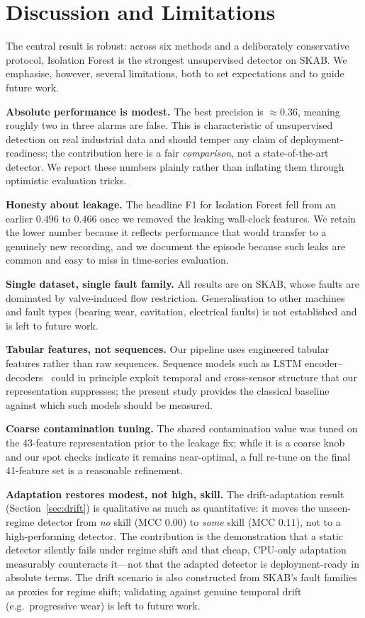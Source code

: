 \documentclass[conference]{IEEEtran}
\begin{document}
\section{Discussion and Limitations}
\label{sec:discussion}
The central result is robust: across six methods and a deliberately conservative
protocol, Isolation Forest is the strongest unsupervised detector on SKAB. We
emphasise, however, several limitations, both to set expectations and to guide
future work.

\textbf{Absolute performance is modest.} The best precision is $\approx 0.36$,
meaning roughly two in three alarms are false. This is characteristic of
unsupervised detection on real industrial data and should temper any claim of
deployment-readiness; the contribution here is a fair \emph{comparison}, not a
state-of-the-art detector. We report these numbers plainly rather than inflating
them through optimistic evaluation tricks.

\textbf{Honesty about leakage.} The headline F1 for Isolation Forest fell from
an earlier $0.496$ to $0.466$ once we removed the leaking wall-clock features.
We retain the lower number because it reflects performance that would transfer
to a genuinely new recording, and we document the episode because such leaks are
common and easy to miss in time-series evaluation.

\textbf{Single dataset, single fault family.} All results are on SKAB, whose
faults are dominated by valve-induced flow restriction. Generalisation to other
machines and fault types (bearing wear, cavitation, electrical faults) is not
established and is left to future work.

\textbf{Tabular features, not sequences.} Our pipeline uses engineered tabular
features rather than raw sequences. Sequence models such as LSTM
encoder--decoders~\cite{malhotra2016} could in principle exploit temporal and
cross-sensor structure that our representation suppresses; the present study
provides the classical baseline against which such models should be measured.

\textbf{Coarse contamination tuning.} The shared contamination value was tuned
on the 43-feature representation prior to the leakage fix; while it is a coarse
knob and our spot checks indicate it remains near-optimal, a full re-tune on the
final 41-feature set is a reasonable refinement.

\textbf{Adaptation restores modest, not high, skill.} The drift-adaptation
result (Section~\ref{sec:drift}) is qualitative as much as quantitative: it
moves the unseen-regime detector from \emph{no} skill (MCC $0.00$) to
\emph{some} skill (MCC $0.11$), not to a high-performing detector. The
contribution is the demonstration that a static detector silently fails under
regime shift and that cheap, CPU-only adaptation measurably counteracts it---not
that the adapted detector is deployment-ready in absolute terms. The drift
scenario is also constructed from SKAB's fault families as proxies for regime
shift; validating against genuine temporal drift (e.g.\ progressive wear) is
left to future work.
\end{document}
